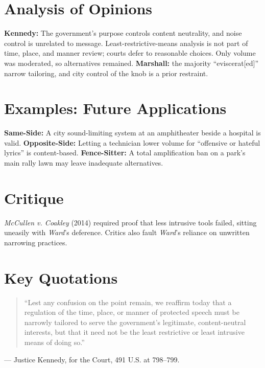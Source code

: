 \documentclass[12pt]{article}
\begin{document}
\section{Analysis of Opinions}
\textbf{Kennedy:} The government's purpose controls content neutrality, and noise control is unrelated to message. Least-restrictive-means analysis is not part of time, place, and manner review; courts defer to reasonable choices. Only volume was moderated, so alternatives remained. \textbf{Marshall:} the majority ``eviscerat[ed]'' narrow tailoring, and city control of the knob is a prior restraint.

\section{Examples: Future Applications}
\textbf{Same-Side:} A city sound-limiting system at an amphitheater beside a hospital is valid. \textbf{Opposite-Side:} Letting a technician lower volume for ``offensive or hateful lyrics'' is content-based. \textbf{Fence-Sitter:} A total amplification ban on a park's main rally lawn may leave inadequate alternatives.

\section{Critique}
\textit{McCullen v. Coakley} (2014) required proof that less intrusive tools failed, sitting uneasily with \textit{Ward}'s deference. Critics also fault \textit{Ward}'s reliance on unwritten narrowing practices.

\section{Key Quotations}
\begin{quote}
``Lest any confusion on the point remain, we reaffirm today that a regulation of the time, place, or manner of protected speech must be narrowly tailored to serve the government's legitimate, content-neutral interests, but that it need not be the least restrictive or least intrusive means of doing so.''
\end{quote}
\noindent --- Justice Kennedy, for the Court, 491 U.S. at 798--799.
\end{document}
